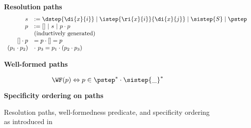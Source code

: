 
\begin{figure}[t]

\begin{minipage}[t]{\hsize}
\begin{boxedminipage}[t]{\hsize}
\textbf{Resolution paths}
\vspace*{-0.4\baselineskip}
$$\begin{array}{rl}
          s & := \dstep{\di{x}{i}} \mid \istep{\ri{x}{i}}{\di{x}{j}} \mid \sistep{S} \mid \pstep\\
          p & := []\ |\ s\ |\ p\cdot p\\
          & \mbox{\rm (inductively generated)} \\[0pt]
          [] \cdot p & = p \cdot [] = p\\
          (p_1 \cdot p_2) &\cdot\ p_3  = p_1 \cdot (p_2 \cdot p_3)
\end{array}$$ 

\textbf{Well-formed paths}

\vspace*{-0.5\baselineskip}

\[
	   \WF(p) \Leftrightarrow p \in \pstep^* \cdot \sistep{\_}^* 
\]
	
\textbf{Specificity ordering on paths}

\medskip
\begin{minipage}{.49\hsize}

\medskip


\medskip


\end{minipage}
\hspace*{-8mm}
\begin{minipage}{.57\hsize}


\medskip


\smallskip
  
\end{minipage}


\end{boxedminipage}
\caption{Resolution paths, well-formedness predicate, and specificity
ordering as introduced in \cite{NeronTVW-ESOP-2015}}
\end{minipage}


\end{figure}
